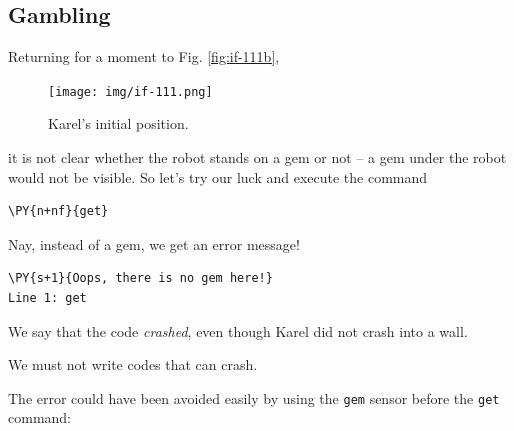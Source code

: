 \subsection{Gambling}

Returning for a moment to Fig. \ref{fig:if-111b},


\begin{figure}[!ht]
\begin{center}
\texttt{[image: img/if-111.png]}
\vspace{-0mm}
\caption{Karel's initial position.}
\label{fig:if-111c}
\vspace{-6mm}
\end{center}
\end{figure}
\noindent
it is not clear whether 
the robot stands on a gem or not -- a gem under the robot would not be visible.
So let's try our luck and execute the command\\

\begin{bbox}
\begin{Verbatim}[commandchars=\\\{\}]
\PY{n+nf}{get}
\end{Verbatim}
\end{bbox}
\vspace{6mm}

\noindent
Nay, instead of a gem, we get an error message!\\

\begin{ybox}
\begin{Verbatim}[commandchars=\\\{\}]
\PY{s+1}{Oops, there is no gem here!}
Line 1: get
\end{Verbatim}
\end{ybox}
\vspace{6mm}

\noindent
We say that the code {\em crashed}, even though Karel did not crash into a wall.\\

\begin{gbox}
\begin{center}
We must not write codes that can crash. 
\end{center}
\end{gbox}
\vspace{6mm}

\noindent
The error could have been avoided easily 
by using the {\tt gem} sensor before the {\tt get} command:\\

